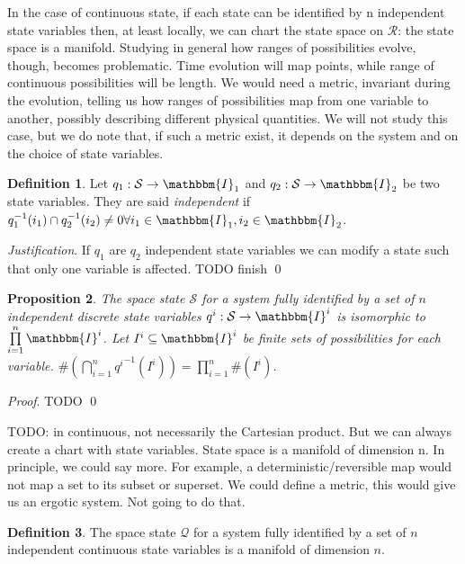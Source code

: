 \documentclass[aps,pra,10pt,twocolumn,floatfix,nofootinbib]{revtex4-1}
\newtheorem{prop}{Proposition}[section]
\theoremstyle{definition}
\newtheorem{defn}[prop]{Definition}
\newenvironment{justification}{\emph{Justification}.}{\qed}
\renewenvironment{proof}{\emph{Proof}.}{\qed}
\begin{document}
In the case of continuous state, if each state can be identified by n independent state variables then, at least locally, we can chart the state space on $\mathcal{R}$: the state space is a manifold. Studying in general how ranges of possibilities evolve, though, becomes problematic. Time evolution will map points, while range of continuous possibilities will be length. We would need a metric, invariant during the evolution, telling us how ranges of possibilities map from one variable to another, possibly describing different physical quantities. We will not study this case, but we do note that, if such a metric exist, it depends on the system and on the choice of state variables.

\begin{defn}\label{independent_state_variables}
Let $q_1 : \mathcal{S} \rightarrow \mathbbm{I}_1$ and $q_2 : \mathcal{S} \rightarrow \mathbbm{I}_2$ be two state variables. They are said \emph{independent} if $q_1^{-1}(i_1)\cap q_2^{-1}(i_2) \neq 0 \forall i_1 \in \mathbbm{I}_1, i_2 \in \mathbbm{I}_2$.
\end{defn}

\begin{justification}
If $q_1$ are $q_2$ independent state variables we can modify a state such that only one variable is affected. TODO finish
\end{justification}

\begin{prop}\label{discrete_state_space}
The space state $\mathcal{S}$ for a system fully identified by a set of $n$ independent discrete state variables $q^i : \mathcal{S} \rightarrow \mathbbm{I}^i$ is isomorphic to $\prod\limits_{i=1}^n\mathbbm{I}^i$. Let $I^i \subseteq \mathbbm{I}^i$ be finite sets of possibilities for each variable. $\#(\bigcap\limits_{i=1}^{n}{q^i}^{-1}(I^i))=\prod\limits_{i=1}^{n}\#(I^i)$.
\end{prop}

\begin{proof}
TODO
\end{proof}

TODO: in continuous, not necessarily the Cartesian product. But we can always create a chart with state variables. State space is a manifold of dimension n. In principle, we could say more. For example, a deterministic/reversible map would not map a set to its subset or superset. We could define a metric, this would give us an ergotic system. Not going to do that.

\begin{defn}\label{continuous_state_space}
The space state $\mathcal{Q}$ for a system fully identified by a set of $n$ independent continuous state variables is a manifold of dimension $n$.
\end{defn}
\end{document}
